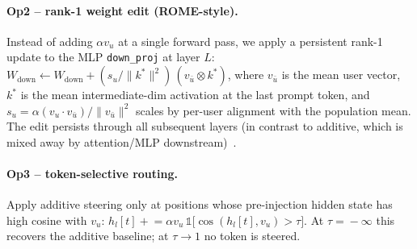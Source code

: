 \documentclass{article}
\begin{document}
\paragraph{Op2 -- rank-1 weight edit (ROME-style).}  Instead of
adding $\alpha v_u$ at a single forward pass, we apply a persistent
rank-1 update to the MLP \texttt{down\_proj} at layer $L$:
$W_{\text{down}}\!\leftarrow\!W_{\text{down}} + (s_u/\|k^{\!*}\|^2)
\,(v_{\bar u}\!\otimes\!k^{\!*})$, where $v_{\bar u}$ is the mean
user vector, $k^{\!*}$ is the mean intermediate-dim activation at
the last prompt token, and $s_u\!=\!\alpha (v_u\!\cdot\!v_{\bar u})/
\|v_{\bar u}\|^2$ scales by per-user alignment with the population
mean.  The edit persists through all subsequent layers (in contrast
to additive, which is mixed away by attention/MLP
downstream)~\cite{meng2022rome}.

\paragraph{Op3 -- token-selective routing.}  Apply additive steering
only at positions whose pre-injection hidden state has high cosine
with $v_u$:
$h_l[t]\!\mathrel{+}=\!\alpha v_u\,\mathbb{1}\!\bigl[\cos(h_l[t],
v_u)\!>\!\tau\bigr]$.  At $\tau\!=\!-\infty$ this recovers the
additive baseline; at $\tau\!\to\!1$ no token is steered.
\end{document}
